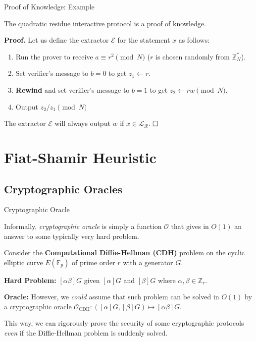\documentclass{zkdl-presentation-template}
\begin{document}
    \begin{frame}{Proof of Knowledge: Example}
        \begin{lemma}
            The quadratic residue interactive protocol is a proof of knowledge.
        \end{lemma}
        
        \textbf{Proof.} Let us define the extractor $\mathcal{E}$ for the statement $x$ as follows:
        \begin{enumerate}
            \item Run the prover to receive $a \equiv r^2 \pmod{N}$ ($r$ is chosen randomly from $\mathbb{Z}_N^*$).
            \item Set verifier's message to $b=0$ to get $z_1 \gets r$.
            \item \textbf{Rewind} and set verifier's message to $b=1$ to get $z_2 \gets rw \pmod{N}$.
            \item Output $z_2/z_1 \pmod{N}$
        \end{enumerate}
        
        The extractor $\mathcal{E}$ will always output $w$ if $x \in \mathcal{L}_{\mathcal{R}}$. $\hfill\Box$
    \end{frame}

    \section{Fiat-Shamir Heuristic}
    \subsection{Cryptographic Oracles}
    \begin{frame}{Cryptographic Oracle}
        \begin{definition}
            Informally, \textit{cryptographic oracle} is simply a function $\mathcal{O}$ that gives in $O(1)$ an answer to some typically very hard problem.     
        \end{definition}
        
        \begin{example}
            Consider the \textbf{Computational Diffie-Hellman (CDH)} problem on the cyclic elliptic curve $E(\mathbb{F}_p)$ of prime order $r$ with a generator $G$. 
            
            \textbf{Hard Problem:} $[\alpha\beta]G$ given $[\alpha]G$ and $[\beta]G$ where $\alpha,\beta \in \mathbb{Z}_r$. 
        
            \textbf{Oracle:} However, we \textit{could} assume that such problem can be solved in $O(1)$ by a cryptographic oracle $\mathcal{O}_{\text{CDH}}: ([\alpha]G,[\beta]G) \mapsto [\alpha\beta]G$. 
            
            This way, we can rigorously prove the security of some cryptographic protocols \textit{even} if the Diffie-Hellman problem is suddenly solved. 
        \end{example}
    \end{frame}
\end{document}

